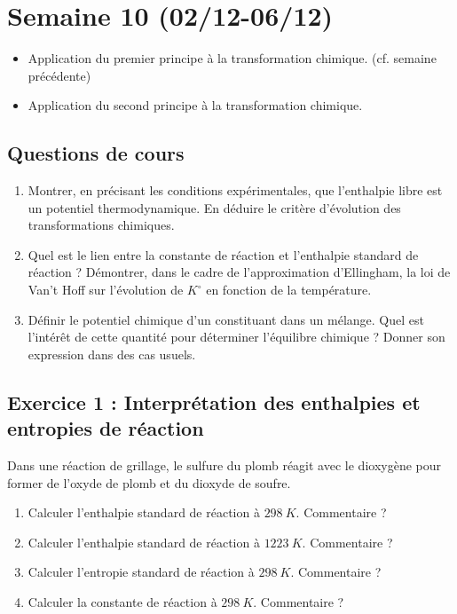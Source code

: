 \section{Semaine 10 (02/12-06/12) }

\begin{itemize}
	\item Application du premier principe à la transformation chimique. (cf. semaine précédente)
	\item Application du second principe à la transformation chimique.
\end{itemize}

\subsection{Questions de cours}

\begin{enumerate}
	\item Montrer, en précisant les conditions expérimentales, que l'enthalpie libre est un potentiel thermodynamique. En déduire le critère d'évolution des transformations chimiques.
	\item Quel est le lien entre la constante de réaction et l'enthalpie standard de réaction ? Démontrer, dans le cadre de l'approximation d'Ellingham, la loi de Van't Hoff sur l'évolution de $K^\circ$ en fonction de la température.
	\item Définir le potentiel chimique d'un constituant dans un mélange. Quel est l'intérêt de cette quantité pour déterminer l'équilibre chimique ? Donner son expression dans des cas usuels.
\end{enumerate}

\subsection{Exercice 1 : Interprétation des enthalpies et entropies de réaction}

Dans une réaction de grillage, le sulfure du plomb réagit avec le dioxygène pour former de l'oxyde de plomb et du dioxyde de soufre.

\begin{enumerate}
	\item Calculer l'enthalpie standard de réaction à $\SI{298}{K}$. Commentaire ?
	\item Calculer l'enthalpie standard de réaction à $\SI{1223}{K}$. Commentaire ?
	\item Calculer l'entropie standard de réaction à $\SI{298}{K}$. Commentaire ?
	\item Calculer la constante de réaction à $\SI{298}{K}$. Commentaire ?
\end{enumerate}


